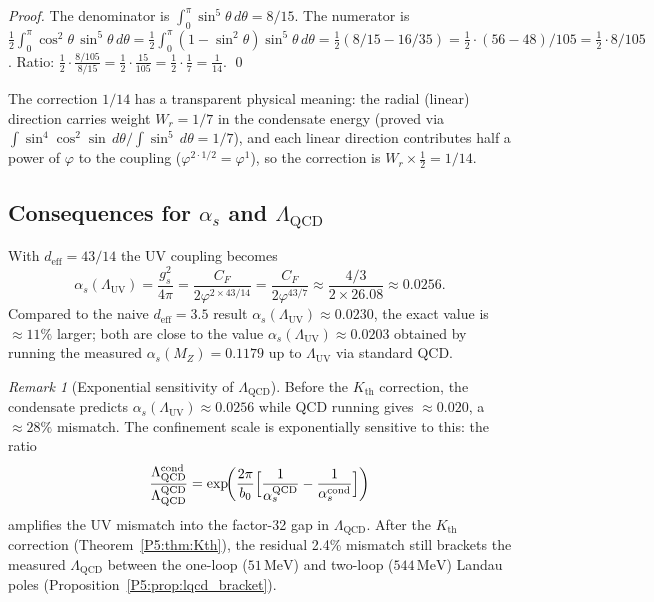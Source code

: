 \documentclass[11pt,a4paper]{article}
\theoremstyle{definition}
\theoremstyle{remark}
\newtheorem{remark}[theorem]{Remark}
\newcommand{\vp}{\varphi}
\newcommand{\LUV}{\Lambda_{\mathrm{UV}}}
\newcommand{\LQCD}{\Lambda_{\mathrm{QCD}}}
\newcommand{\deff}{d_{\mathrm{eff}}}
\begin{document}
\begin{proof}
The denominator is $\int_0^\pi\sin^5\theta\,d\theta = 8/15$.
The numerator is $\tfrac{1}{2}\int_0^\pi\cos^2\!\theta\,\sin^5\theta\,d\theta
= \tfrac{1}{2}\int_0^\pi(1-\sin^2\!\theta)\sin^5\theta\,d\theta
= \tfrac{1}{2}(8/15 - 16/35)
= \tfrac{1}{2}\cdot(56-48)/105
= \tfrac{1}{2}\cdot 8/105$.
Ratio: $\tfrac{1}{2}\cdot\frac{8/105}{8/15} = \tfrac{1}{2}\cdot\frac{15}{105} = \tfrac{1}{2}\cdot\frac{1}{7} = \frac{1}{14}$.
\qed
\end{proof}

\noindent
The correction $1/14$ has a transparent physical meaning: the radial
(linear) direction carries weight $W_r = 1/7$ in the condensate energy
(proved via $\int\sin^4\cos^2\sin\,d\theta / \int\sin^5\,d\theta = 1/7$),
and each linear direction contributes half a power of $\vp$ to the
coupling ($\vp^{2\cdot 1/2} = \vp^1$), so the correction is
$W_r \times \tfrac{1}{2} = 1/14$.

\subsection{Consequences for $\alpha_s$ and $\Lambda_{\mathrm{QCD}}$}

With $\deff=43/14$ the UV coupling becomes
\begin{equation}
  \alpha_s(\LUV)
  = \frac{g_s^2}{4\pi}
  = \frac{C_F}{2\vp^{2\times43/14}}
  = \frac{C_F}{2\vp^{43/7}}
  \approx \frac{4/3}{2\times 26.08}
  \approx 0.0256.
  \label{P5:eq:as_UV_exact}
\end{equation}
Compared to the naive $\deff=3.5$ result $\alpha_s(\LUV)\approx0.0230$,
the exact value is $\approx11\%$ larger; both are close to the value
$\alpha_s(\LUV)\approx0.0203$ obtained by running the measured
$\alpha_s(M_Z)=0.1179$ up to $\LUV$ via standard QCD.

\begin{remark}[Exponential sensitivity of $\Lambda_{\mathrm{QCD}}$]
\label{P5:rem:exp_sensitivity}
Before the $K_{\mathrm{th}}$ correction, the condensate predicts
$\alpha_s(\LUV)\approx0.0256$ while QCD running gives $\approx0.020$,
a $\approx28\%$ mismatch.  The confinement scale is exponentially
sensitive to this: the ratio
\begin{equation}
  \frac{\LQCD^{\mathrm{cond}}}{\LQCD^{\mathrm{QCD}}}
  = \exp\!\biggl(\frac{2\pi}{b_0}
    \Bigl[\frac{1}{\alpha_s^{\mathrm{QCD}}}-\frac{1}{\alpha_s^{\mathrm{cond}}}\Bigr]
    \biggr)
  \label{P5:eq:LQCD_amplification}
\end{equation}
amplifies the UV mismatch into the factor-32 gap in $\LQCD$.
After the $K_{\mathrm{th}}$ correction (Theorem~\ref{P5:thm:Kth}),
the residual 2.4\% mismatch still brackets the measured $\LQCD$
between the one-loop ($51\,\mathrm{MeV}$) and two-loop ($544\,\mathrm{MeV}$)
Landau poles (Proposition~\ref{P5:prop:lqcd_bracket}).
\end{remark}
\end{document}

